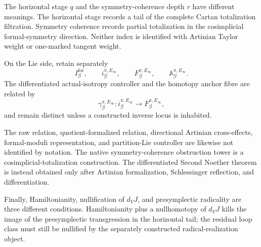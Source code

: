 The horizontal stage $q$ and the symmetry-coherence depth $r$ have different
meanings.  The horizontal stage records a tail of the complete Cartan totalization
filtration.  Symmetry coherence records partial totalization in the cosimplicial
formal-symmetry direction.  Neither index is identified with Artinian Taylor weight
or one-marked tangent weight.

On the Lie side, retain separately
\[
I^{\mathrm{for}}_{\mathcal G},\qquad
i_{\mathcal G}^{\pi,E_\infty},\qquad
F_{\mathcal G}^{\pi,E_\infty},\qquad
\mathbb A_{\mathcal G}^{\pi,E_\infty}.
\]
The differentiated actual-isotropy controller and the homotopy anchor fibre are
related by
\[
\gamma_{\mathcal G}^{\pi,E_\infty}:
i_{\mathcal G}^{\pi,E_\infty}
\longrightarrow
F_{\mathcal G}^{\pi,E_\infty},
\]
and remain distinct unless a constructed inverse locus is inhabited.

The raw relation, quotient-formalized relation, directional Artinian cross-effects,
formal-moduli representation, and partition-Lie controller are likewise not
identified by notation.  The native symmetry-coherence obstruction tower is a
cosimplicial-totalization construction.  The differentiated Second Noether theorem
is instead obtained only after Artinian formalization, Schlessinger reflection, and
differentiation.

Finally, Hamiltonianity, nullification of $d_VJ$, and presymplectic radicality are
three different conditions.  Hamiltonianity plus a nullhomotopy of $d_VJ$ kills the
image of the presymplectic transgression in the horizontal tail; the residual loop
class must still be nullified by the separately constructed radical-realization
object.

